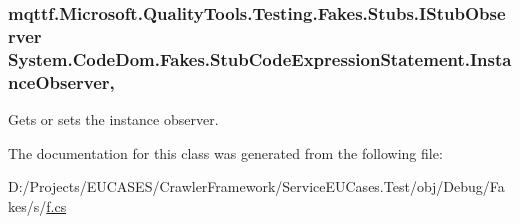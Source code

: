 \hypertarget{class_system_1_1_code_dom_1_1_fakes_1_1_stub_code_expression_statement_a5383233354b4c54d76359a0e1c61f07a}{
\subsubsection[{Instance\-Observer}]{\setlength{\rightskip}{0pt plus 5cm}mqttf.\-Microsoft.\-Quality\-Tools.\-Testing.\-Fakes.\-Stubs.\-I\-Stub\-Observer System.\-Code\-Dom.\-Fakes.\-Stub\-Code\-Expression\-Statement.\-Instance\-Observer\hspace{0.3cm}{\ttfamily [get]}, {\ttfamily [set]}}}\label{class_system_1_1_code_dom_1_1_fakes_1_1_stub_code_expression_statement_a5383233354b4c54d76359a0e1c61f07a}


Gets or sets the instance observer.



The documentation for this class was generated from the following file\-:\begin{DoxyCompactItemize}
\item 
D\-:/\-Projects/\-E\-U\-C\-A\-S\-E\-S/\-Crawler\-Framework/\-Service\-E\-U\-Cases.\-Test/obj/\-Debug/\-Fakes/s/\hyperlink{s_2f_8cs}{f.\-cs}\end{DoxyCompactItemize}
